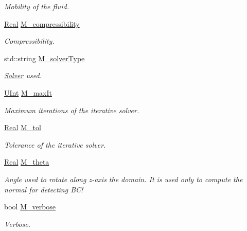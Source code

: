 \begin{DoxyCompactItemize}
\begin{DoxyCompactList}\small\item\em Mobility of the fluid. \end{DoxyCompactList}\item 
\hyperlink{namespaceFVCode3D_a40c1f5588a248569d80aa5f867080e83}{Real} \hyperlink{classFVCode3D_1_1Data_a8fc9be504e0a36500d75f1991d95caaa}{M\+\_\+compressibility}
\begin{DoxyCompactList}\small\item\em Compressibility. \end{DoxyCompactList}\item 
std\+::string \hyperlink{classFVCode3D_1_1Data_a38b6dc5c0b7c6f4734be7b60b231e56b}{M\+\_\+solver\+Type}
\begin{DoxyCompactList}\small\item\em \hyperlink{classFVCode3D_1_1Solver}{Solver} used. \end{DoxyCompactList}\item 
\hyperlink{namespaceFVCode3D_a4bf7e328c75d0fd504050d040ebe9eda}{U\+Int} \hyperlink{classFVCode3D_1_1Data_a2691a1563c9a9d1f9fa991acac368c6a}{M\+\_\+max\+It}
\begin{DoxyCompactList}\small\item\em Maximum iterations of the iterative solver. \end{DoxyCompactList}\item 
\hyperlink{namespaceFVCode3D_a40c1f5588a248569d80aa5f867080e83}{Real} \hyperlink{classFVCode3D_1_1Data_a00dd1282e39bfdf77368f3c79382c5c4}{M\+\_\+tol}
\begin{DoxyCompactList}\small\item\em Tolerance of the iterative solver. \end{DoxyCompactList}\item 
\hyperlink{namespaceFVCode3D_a40c1f5588a248569d80aa5f867080e83}{Real} \hyperlink{classFVCode3D_1_1Data_a984e97d7d25e882ba1b089b3d82f78c3}{M\+\_\+theta}
\begin{DoxyCompactList}\small\item\em Angle used to rotate along z-\/axis the domain. It is used only to compute the normal for detecting B\+C! \end{DoxyCompactList}\item 
bool \hyperlink{classFVCode3D_1_1Data_abce1861779ec036fc587fb69a7fe8c6c}{M\+\_\+verbose}
\begin{DoxyCompactList}\small\item\em Verbose. \end{DoxyCompactList}\end{DoxyCompactItemize}


